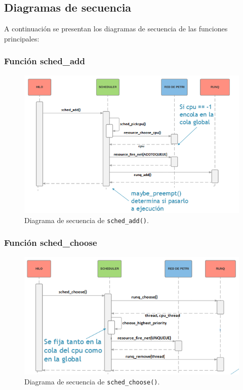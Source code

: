 \documentclass[a4paper]{book}
\begin{document}
\newpage
\subsection{Diagramas de secuencia}

A continuaci\'on se presentan los diagramas de secuencia de las funciones principales:

\subsubsection{Funci\'on sched\_add}

\begin{figure} [H]
	\begin{center}
        \includegraphics[scale=0.72]{./imagenes/sched_add.png}
		\cprotect\caption{Diagrama de secuencia de \verb|sched_add()|.}
	\end{center}
\end{figure}

\subsubsection{Funci\'on sched\_choose}

\begin{figure} [H]
	\begin{center}
        \includegraphics[scale=0.80]{./imagenes/sched_choose.png}
		\cprotect\caption{Diagrama de secuencia de \verb|sched_choose()|.}
	\end{center}
\end{figure}
\end{document}
